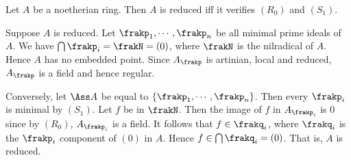     \begin{example}\label{eg: R-S criterion of reducedness}
        Let $A$ be a noetherian ring.
        Then $A$ is reduced iff it verifies $(R_0)$ and $(S_1)$.

        Suppose $A$ is reduced.
        Let $\frakp_1,\cdots,\frakp_n$ be all minimal prime ideals of $A$.
        We have $\bigcap \frakp_i = \frakN = (0)$, where $\frakN$ is the nilradical of $A$.
        Hence $A$ has no embedded point.
        Since $A_\frakp$ is artinian, local and reduced, $A_\frakp$ is a field and hence regular.
        
        Conversely, let $\Ass A$ be equal to $\{\frakp_1,\cdots,\frakp_n\}$.
        Then every $\frakp_i$ is minimal by $(S_1)$.
        Let $f$ be in $\frakN$.
        Then the image of $f$ in $A_{\frakp_i}$ is $0$ since by $(R_0)$, $A_{\frakp_i}$ is a field.
        It follows that $f \in \frakq_i$, where $\frakq_i$ is the $\frakp_i$ component of $(0)$ in $A$.
        Hence $f \in \bigcap \frakq_i = (0)$.
        That is, $A$ is reduced.
    \end{example}



        
